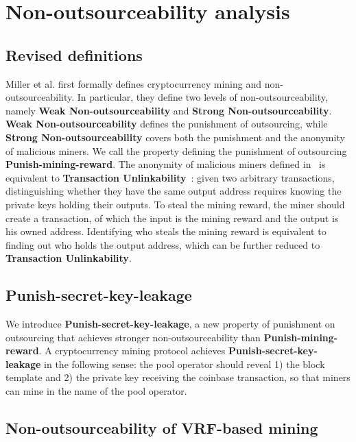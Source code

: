 \documentclass[sigconf]{acmart}
\begin{document}
\section{Non-outsourceability analysis}
\label{sec:non_outsourceability}

\subsection{Revised definitions}

Miller et al. \cite{miller2015nonoutsourceable} first formally defines cryptocurrency mining and non-outsourceability.
In particular, they define two levels of non-outsourceability, namely \textbf{Weak Non-outsourceability} and \textbf{Strong Non-outsourceability}.
\textbf{Weak Non-outsourceability} defines the punishment of outsourcing, while \textbf{Strong Non-outsourceability} covers both the punishment and the anonymity of malicious miners.
We call the property defining the punishment of outsourcing \textbf{Punish-mining-reward}.
The anonymity of malicious miners defined in~\cite{miller2015nonoutsourceable} is equivalent to \textbf{Transaction Unlinkability}~\cite{van2013cryptonote}: given two arbitrary transactions, distinguishing whether they have the same output address requires knowing the private keys holding their outputs.
To steal the mining reward, the miner should create a transaction, of which the input is the mining reward and the output is his owned address.
Identifying who steals the mining reward is equivalent to finding out who holds the output address, which can be further reduced to \textbf{Transaction Unlinkability}.


\subsection{Punish-secret-key-leakage}

We introduce \textbf{Punish-secret-key-leakage}, a new property of punishment on outsourcing that achieves stronger non-outsourceability than \textbf{Punish-mining-reward}.
A cryptocurrency mining protocol achieves \textbf{Punish-secret-key-leakage} in the following sense: the pool operator should reveal 1) the block template and 2) the private key receiving the coinbase transaction, so that miners can mine in the name of the pool operator.

\subsection{Non-outsourceability of VRF-based mining}
\end{document}
